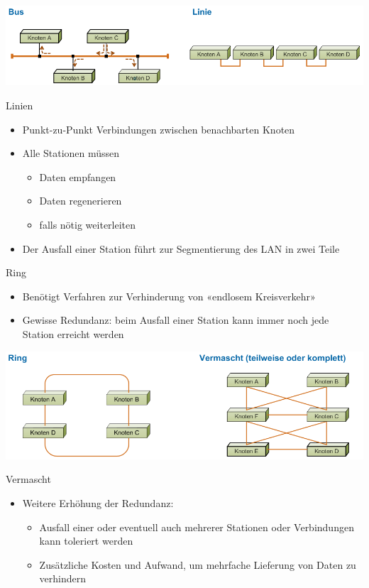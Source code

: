  
    \centering
    \includegraphics[width=1\linewidth]{images/bus_linie_topo.png}
 

\begin{definition}{Linien}
    \begin{itemize}
        \item Punkt-zu-Punkt Verbindungen zwischen benachbarten Knoten
        \item Alle Stationen müssen
        \begin{itemize}
            \item Daten empfangen
            \item Daten regenerieren
            \item falls nötig weiterleiten
        \end{itemize}
        \item Der Ausfall einer Station führt zur Segmentierung des LAN in zwei Teile
    \end{itemize}
\end{definition}

\begin{definition}{Ring}
    \begin{itemize}
        \item Benötigt Verfahren zur Verhinderung von «endlosem Kreisverkehr»
        \item Gewisse Redundanz: beim Ausfall einer Station kann immer noch jede Station erreicht werden
    \end{itemize}
\end{definition}

 
    \centering
    \includegraphics[width=1\linewidth]{images/ring_vermascht_topo.png}
 

\begin{definition}{Vermascht}
    \begin{itemize}
        \item Weitere Erhöhung der Redundanz:
        \begin{itemize}
            \item Ausfall einer oder eventuell auch mehrerer Stationen oder Verbindungen kann toleriert werden
            \item Zusätzliche Kosten und Aufwand, um mehrfache Lieferung von Daten zu verhindern
        \end{itemize}
    \end{itemize}
\end{definition}

